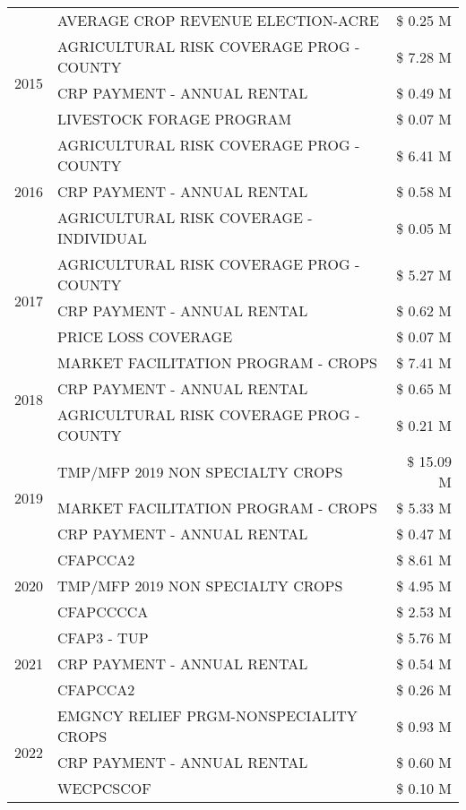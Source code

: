 \begin{tabular}{llr}
 & AVERAGE CROP REVENUE ELECTION-ACRE & \$ 0.25 M \\
\cline{1-3}
\multirow[t]{3}{*}{2015} & AGRICULTURAL RISK COVERAGE PROG - COUNTY & \$ 7.28 M \\
 & CRP PAYMENT - ANNUAL RENTAL & \$ 0.49 M \\
 & LIVESTOCK FORAGE PROGRAM & \$ 0.07 M \\
\cline{1-3}
\multirow[t]{3}{*}{2016} & AGRICULTURAL RISK COVERAGE PROG - COUNTY & \$ 6.41 M \\
 & CRP PAYMENT - ANNUAL RENTAL & \$ 0.58 M \\
 & AGRICULTURAL RISK COVERAGE - INDIVIDUAL & \$ 0.05 M \\
\cline{1-3}
\multirow[t]{3}{*}{2017} & AGRICULTURAL RISK COVERAGE PROG - COUNTY & \$ 5.27 M \\
 & CRP PAYMENT - ANNUAL RENTAL & \$ 0.62 M \\
 & PRICE LOSS COVERAGE & \$ 0.07 M \\
\cline{1-3}
\multirow[t]{3}{*}{2018} & MARKET FACILITATION PROGRAM - CROPS & \$ 7.41 M \\
 & CRP PAYMENT - ANNUAL RENTAL & \$ 0.65 M \\
 & AGRICULTURAL RISK COVERAGE PROG - COUNTY & \$ 0.21 M \\
\cline{1-3}
\multirow[t]{3}{*}{2019} & TMP/MFP 2019 NON SPECIALTY CROPS & \$ 15.09 M \\
 & MARKET FACILITATION PROGRAM - CROPS & \$ 5.33 M \\
 & CRP PAYMENT - ANNUAL RENTAL & \$ 0.47 M \\
\cline{1-3}
\multirow[t]{3}{*}{2020} & CFAPCCA2 & \$ 8.61 M \\
 & TMP/MFP 2019 NON SPECIALTY CROPS & \$ 4.95 M \\
 & CFAPCCCCA & \$ 2.53 M \\
\cline{1-3}
\multirow[t]{3}{*}{2021} & CFAP3 - TUP & \$ 5.76 M \\
 & CRP PAYMENT - ANNUAL RENTAL & \$ 0.54 M \\
 & CFAPCCA2 & \$ 0.26 M \\
\cline{1-3}
\multirow[t]{3}{*}{2022} & EMGNCY RELIEF PRGM-NONSPECIALITY CROPS & \$ 0.93 M \\
 & CRP PAYMENT - ANNUAL RENTAL & \$ 0.60 M \\
 & WECPCSCOF & \$ 0.10 M \\
\cline{1-3}
\bottomrule
\end{tabular}
